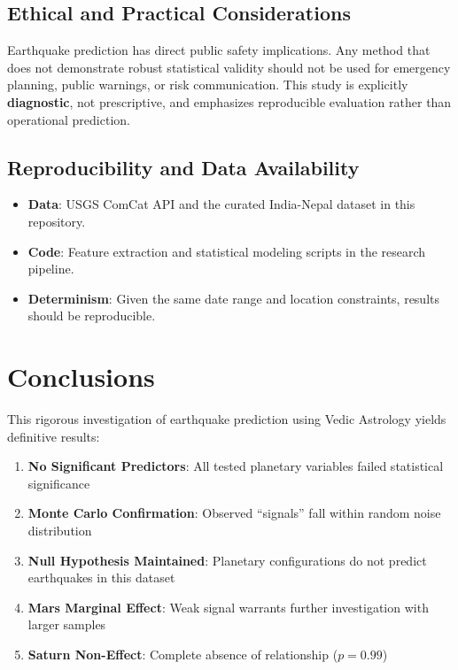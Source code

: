 \documentclass[
  11pt,
  a4paper,
  oneside,
  openany]{article}
\providecommand{\tightlist}{%
  \setlength{\itemsep}{0pt}\setlength{\parskip}{0pt}}\usepackage{longtable,booktabs,array}
\begin{document}
\subsection{Ethical and Practical
Considerations}\label{ethical-and-practical-considerations}

Earthquake prediction has direct public safety implications. Any method
that does not demonstrate robust statistical validity should not be used
for emergency planning, public warnings, or risk communication. This
study is explicitly \textbf{diagnostic}, not prescriptive, and
emphasizes reproducible evaluation rather than operational prediction.

\subsection{Reproducibility and Data
Availability}\label{reproducibility-and-data-availability}

\begin{itemize}
\tightlist
\item
  \textbf{Data}: USGS ComCat API and the curated India-Nepal dataset in
  this repository.
\item
  \textbf{Code}: Feature extraction and statistical modeling scripts in
  the research pipeline.
\item
  \textbf{Determinism}: Given the same date range and location
  constraints, results should be reproducible.
\end{itemize}

\section{Conclusions}\label{conclusions}

This rigorous investigation of earthquake prediction using Vedic
Astrology yields definitive results:

\begin{enumerate}
\def\labelenumi{\arabic{enumi}.}
\tightlist
\item
  \textbf{No Significant Predictors}: All tested planetary variables
  failed statistical significance
\item
  \textbf{Monte Carlo Confirmation}: Observed ``signals'' fall within
  random noise distribution
\item
  \textbf{Null Hypothesis Maintained}: Planetary configurations do not
  predict earthquakes in this dataset
\item
  \textbf{Mars Marginal Effect}: Weak signal warrants further
  investigation with larger samples
\item
  \textbf{Saturn Non-Effect}: Complete absence of relationship
  (\(p = 0.99\))
\end{enumerate}
\end{document}
